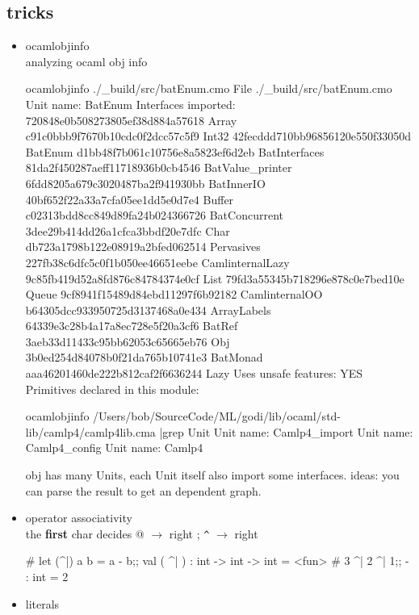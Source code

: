 \subsection{tricks}
\label{sec:tricks}

\begin{itemize}
\item ocamlobjinfo \\
  analyzing ocaml obj info

\begin{bluetext}
ocamlobjinfo ./_build/src/batEnum.cmo
File ./_build/src/batEnum.cmo
Unit name: BatEnum
Interfaces imported:
	720848e0b508273805ef38d884a57618	Array
	c91c0bbb9f7670b10cdc0f2dcc57c5f9	Int32
	42fecddd710bb96856120e550f33050d	BatEnum
	d1bb48f7b061c10756e8a5823ef6d2eb	BatInterfaces
	81da2f450287aeff11718936b0cb4546	BatValue_printer
	6fdd8205a679c3020487ba2f941930bb	BatInnerIO
	40bf652f22a33a7cfa05ee1dd5e0d7e4	Buffer
	c02313bdd8cc849d89fa24b024366726	BatConcurrent
	3dee29b414dd26a1cfca3bbdf20e7dfc	Char
	db723a1798b122e08919a2bfed062514	Pervasives
	227fb38c6dfc5c0f1b050ee46651eebe	CamlinternalLazy
	9c85fb419d52a8fd876c84784374e0cf	List
	79fd3a55345b718296e878c0e7bed10e	Queue
	9cf8941f15489d84ebd11297f6b92182	CamlinternalOO
	b64305dcc933950725d3137468a0e434	ArrayLabels
	64339e3c28b4a17a8ec728e5f20a3cf6	BatRef
	3aeb33d11433c95bb62053c65665eb76	Obj
	3b0ed254d84078b0f21da765b10741e3	BatMonad
	aaa46201460de222b812caf2f6636244	Lazy
Uses unsafe features: YES
Primitives declared in this module:

ocamlobjinfo /Users/bob/SourceCode/ML/godi/lib/ocaml/std-lib/camlp4/camlp4lib.cma |grep Unit
Unit name: Camlp4_import
Unit name: Camlp4_config
Unit name: Camlp4
\end{bluetext}
  obj has many Units, each Unit itself also import some
  interfaces. ideas: you can parse the result to get an dependent graph.
\item operator associativity \\
  the \textbf{first} char decides
  @ $\rightarrow$ right ;  \verb|^| $\rightarrow$ right

\begin{alternate}
# let (^|) a b = a - b;;
val ( ^| ) : int -> int -> int = <fun>
# 3 ^| 2 ^| 1;;
- : int = 2
\end{alternate}

\item literals


\end{itemize}
